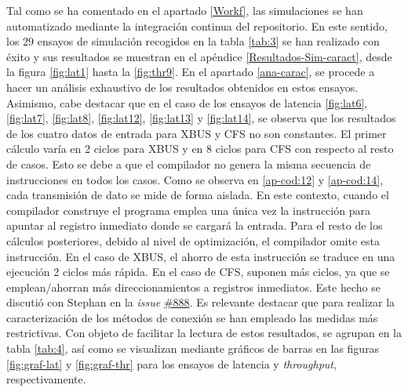 Tal como se ha comentado en el apartado \ref{Workf}, las simulaciones se han automatizado mediante la integración continua del repositorio.
En este sentido, los 29 ensayos de simulación recogidos en la tabla \ref{tab:3} se han realizado con éxito y sus resultados se muestran en el apéndice \ref{Resultados-Sim-caract}, desde la figura \ref{fig:lat1} hasta la \ref{fig:thr9}.
En el apartado \ref{ana-carac}, se procede a hacer un análisis exhaustivo de los resultados obtenidos en estos ensayos.
Asimismo, cabe destacar que en el caso de los ensayos de latencia \ref{fig:lat6}, \ref{fig:lat7}, \ref{fig:lat8}, \ref{fig:lat12}, \ref{fig:lat13} y \ref{fig:lat14}, se observa que los resultados de los cuatro datos de entrada para XBUS y CFS no son constantes.
El primer cálculo varía en 2 ciclos para XBUS y en 8 ciclos para CFS con respecto al resto de casos.
Esto se debe a que el compilador no genera la misma secuencia de instrucciones en todos los casos.
Como se observa en \ref{ap-cod:12} y \ref{ap-cod:14}, cada transmisión de dato se mide de forma aislada.
En este contexto, cuando el compilador construye el programa emplea una única vez la instrucción para apuntar al registro inmediato donde se cargará la entrada.
Para el resto de los cálculos posteriores, debido al nivel de optimización, el compilador omite esta instrucción.
En el caso de XBUS, el ahorro de esta instrucción se traduce en una ejecución 2 ciclos más rápida.
En el caso de CFS, suponen más ciclos, ya que se emplean/ahorran más direccionamientos a registros inmediatos.
Este hecho se discutió con Stephan en la \textit{issue} \href{https://github.com/stnolting/neorv32/issues/888}{\#888}.
Es relevante destacar que para realizar la caracterización de los métodos de conexión se han empleado las medidas más restrictivas. 
Con objeto de facilitar la lectura de estos resultados, se agrupan en la tabla \ref{tab:4}, así como se visualizan mediante gráficos de barras en las figuras \ref{fig:graf-lat} y \ref{fig:graf-thr} para los ensayos de latencia y \textit{throughput}, respectivamente.

